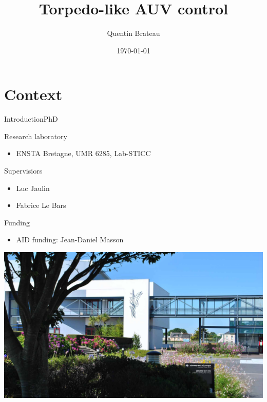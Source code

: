\documentclass[10pt, xcolor={usenames, dvipsnames}]{beamer}
\title{Torpedo-like AUV control}
\date{\today}
\author{Quentin Brateau}
\institute{ENSTA Bretagne}
\begin{document}
    \maketitle

    \section{Context}

        \begin{frame}{Introduction}{PhD}
            \centering
            \begin{minipage}[c]{0.58\textwidth}
                \begin{block}{Research laboratory}
                    \vspace{0.2cm}
                    \begin{itemize}
                        \item ENSTA Bretagne, UMR 6285, Lab-STICC
                    \end{itemize}
                \end{block}

                \begin{block}{Supervisiors}
                    \begin{itemize}
                        \item Luc Jaulin
                        \item Fabrice Le Bars
                    \end{itemize}
                \end{block}

                \begin{block}{Funding}
                    \begin{itemize}
                        \item AID funding: Jean-Daniel Masson
                    \end{itemize}
                \end{block}
            \end{minipage}
            \hfill
            \begin{minipage}[c]{0.4\textwidth}
                \includegraphics[height=0.7\textheight, trim={24cm 0 16cm 0}, clip]{imgs/ensta.jpg}
            \end{minipage}
        \end{frame}
\end{document}
